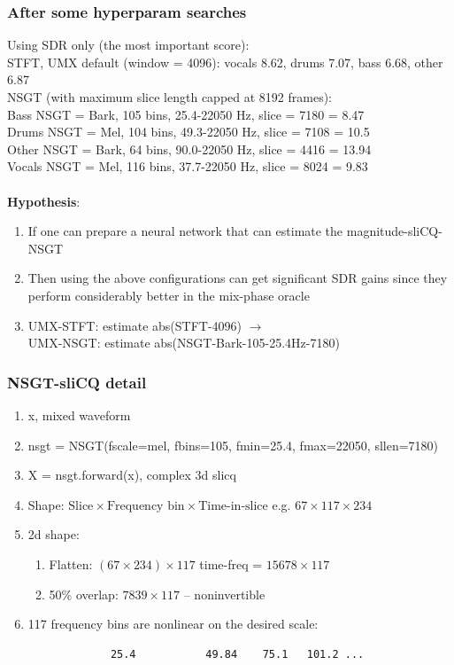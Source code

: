 \documentclass[usenames,dvipsnames]{beamer}
\begin{document}
\begin{frame}
	\frametitle{After some hyperparam searches}
	Using SDR only (the most important score):\\
	STFT, UMX default (window = 4096): vocals 8.62, drums 7.07, bass 6.68, other 6.87\\

	NSGT (with maximum slice length capped at 8192 frames):\\

	Bass NSGT = Bark, 105 bins, 25.4-22050 Hz, slice = 7180 = 8.47\\
	Drums NSGT = Mel, 104 bins, 49.3-22050 Hz, slice = 7108 = 10.5\\
	Other NSGT = Bark, 64 bins, 90.0-22050 Hz, slice = 4416 = 13.94\\
	Vocals NSGT = Mel, 116 bins, 37.7-22050 Hz, slice = 8024 = 9.83\\\ \\


	\textbf{Hypothesis}:
	\begin{enumerate}
		\item
			If one can prepare a neural network that can estimate the magnitude-sliCQ-NSGT
		\item
			Then using the above configurations can get significant SDR gains since they perform considerably better in the mix-phase oracle
		\item
			UMX-STFT: estimate abs(STFT-4096) $\rightarrow$ \\
			\qquad UMX-NSGT: estimate abs(NSGT-Bark-105-25.4Hz-7180)
	\end{enumerate}
\end{frame}

\begin{frame}[fragile]
	\frametitle{NSGT-sliCQ detail}

	\begin{enumerate}
		\item
			x, mixed waveform
		\item
			nsgt = NSGT(fscale=mel, fbins=105, fmin=25.4, fmax=22050, sllen=7180)
		\item
			X = nsgt.forward(x), complex 3d slicq
		\item
			Shape: $\text{Slice} \times \text{Frequency bin} \times \text{Time-in-slice}$
			e.g. $67 \times 117 \times 234$
		\item
			2d shape:
			\begin{enumerate}
				\item
					Flatten: $(67 \times 234) \times 117$ time-freq = $15678 \times 117$
				\item
					50\% overlap: $7839 \times 117$ -- noninvertible
			\end{enumerate}
		\item
			117 frequency bins are nonlinear on the desired scale:
			\begin{verbatim}
			 25.4           49.84    75.1   101.2 ...
			\end{verbatim}
	\end{enumerate}
\end{frame}
\end{document}
